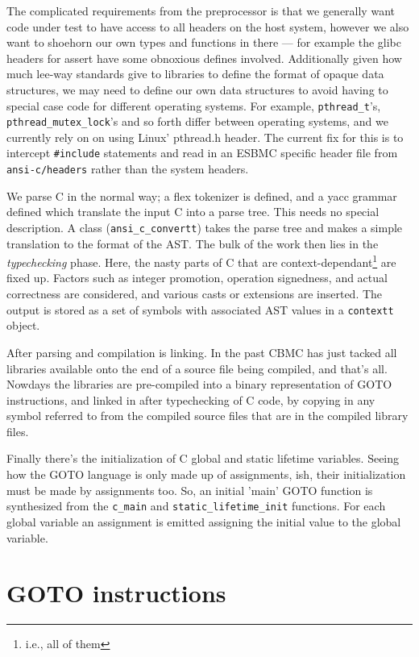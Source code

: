 \documentclass{article}
\begin{document}
The complicated requirements from the preprocessor is that we generally want
code under test to have access to all headers on the host system, however we
also want to shoehorn our own types and functions in there --- for example the
glibc headers for assert have some obnoxious defines involved. Additionally
given how much lee-way standards give to libraries to define the format of
opaque data structures, we may need to define our own data structures to
avoid having to special case code for different operating systems. For example,
\texttt{pthread\_t}'s, \texttt{pthread\_mutex\_lock}'s and so forth differ
between operating systems, and we currently rely on on using Linux' pthread.h
header. The current fix for this is to intercept \texttt{\#include} statements
and read in an ESBMC specific header file from \texttt{ansi-c/headers} rather
than the system headers.

We parse C in the normal way; a flex tokenizer is defined, and a yacc grammar
defined which translate the input C into a parse tree. This needs no special
description. A class (\texttt{ansi\_c\_convertt}) takes the parse tree and
makes a simple translation to the format of the AST. The bulk of the work then
lies in the \textit{typechecking} phase. Here, the nasty parts of C that are
context-dependant\footnote{i.e., all of them} are fixed up. Factors such as
integer promotion, operation signedness, and actual correctness are
considered, and various casts or extensions are inserted. The output is stored
as a set of symbols with associated AST values in a \texttt{contextt} object.

After parsing and compilation is linking. In the past CBMC has just
tacked all libraries available onto the end of a source file being compiled,
and that's all. Nowdays the libraries are pre-compiled into a binary
representation of GOTO instructions, and linked in after typechecking of C
code, by copying in any symbol referred to from the compiled source files
that are in the compiled library files.

Finally there's the initialization of C global and static lifetime variables.
Seeing how the GOTO language is only made up of assignments, ish, their
initialization must be made by assignments too. So, an initial 'main' GOTO
function is synthesized from the \texttt{c\_main} and
\texttt{static\_lifetime\_init} functions. For each global variable an
assignment is emitted assigning the initial value to the global variable.

\section{GOTO instructions}
\end{document}

